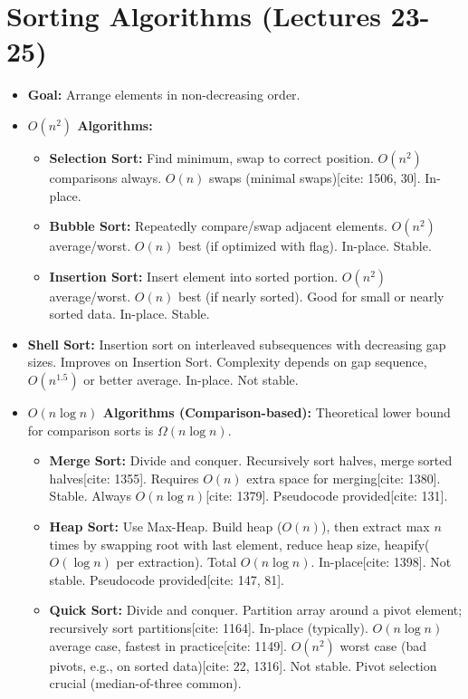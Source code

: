 \documentclass{article}
\begin{document}
\section{Sorting Algorithms (Lectures 23-25)}
\begin{itemize}
    \item \textbf{Goal:} Arrange elements in non-decreasing order.
    \item \textbf{$O(n^2)$ Algorithms:}
          \begin{itemize}
              \item \textbf{Selection Sort:} Find minimum, swap to correct position. $O(n^2)$ comparisons always. $O(n)$ swaps (minimal swaps)[cite: 1506, 30]. In-place.
              \item \textbf{Bubble Sort:} Repeatedly compare/swap adjacent elements. $O(n^2)$ average/worst. $O(n)$ best (if optimized with flag). In-place. Stable.
              \item \textbf{Insertion Sort:} Insert element into sorted portion. $O(n^2)$ average/worst. $O(n)$ best (if nearly sorted). Good for small or nearly sorted data. In-place. Stable.
          \end{itemize}
    \item \textbf{Shell Sort:} Insertion sort on interleaved subsequences with decreasing gap sizes. Improves on Insertion Sort. Complexity depends on gap sequence, $O(n^{1.5})$ or better average. In-place. Not stable.
    \item \textbf{$O(n \log n)$ Algorithms (Comparison-based):} Theoretical lower bound for comparison sorts is $\Omega(n \log n)$.
          \begin{itemize}
              \item \textbf{Merge Sort:} Divide and conquer. Recursively sort halves, merge sorted halves[cite: 1355]. Requires $O(n)$ extra space for merging[cite: 1380]. Stable. Always $O(n \log n)$[cite: 1379]. Pseudocode provided[cite: 131].
              \item \textbf{Heap Sort:} Use Max-Heap. Build heap ($O(n)$), then extract max $n$ times by swapping root with last element, reduce heap size, heapify($O(\log n)$ per extraction). Total $O(n \log n)$. In-place[cite: 1398]. Not stable. Pseudocode provided[cite: 147, 81].
              \item \textbf{Quick Sort:} Divide and conquer. Partition array around a pivot element; recursively sort partitions[cite: 1164]. In-place (typically). $O(n \log n)$ average case, fastest in practice[cite: 1149]. $O(n^2)$ worst case (bad pivots, e.g., on sorted data)[cite: 22, 1316]. Not stable. Pivot selection crucial (median-of-three common).

\end{itemize}
\end{itemize}
\end{document}
